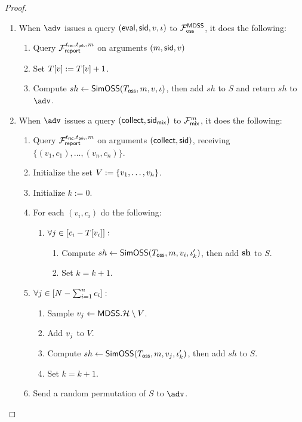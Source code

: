 \begin{proof}
\begin{techbox}
\begin{enumerate}
		\item When $\adv$ issues a query $({\sf eval}, {\sf sid}, v, \iota)$ to $\mathcal{F}_{\sf oss}^{\sf MDSS}$, it does the following:
		\begin{enumerate}
		\item Query $\mathcal{F}_{\sf report}^{t_{\sf rec},t_{\sf priv},m}$ on arguments $(m, {\sf sid}, v)$
		\item Set $T[v] := T[v] + 1$.
		\item Compute $sh \leftarrow {\sf SimOSS}(T_{\sf oss}, m, v, \iota)$, then add $sh$ to $S$ and return $sh$ to $\adv$.
		\end{enumerate}
		\item When $\adv$ issues a query $({\sf collect}, {\sf sid}_{\sf mix})$ to $\mathcal{F}_{\sf mix}^{m}$, it does the following:
		\begin{enumerate}
		\item Query $\mathcal{F}_{\sf report}^{t_{\sf rec},t_{\sf priv},m}$ on arguments $({\sf collect}, {\sf sid})$, receiving $\{(v_1, c_1),\dots,(v_n, c_n)\}$.
		\item Initialize the set $V := \{v_1,\dots,v_{h}\}$.
		\item Initialize $k := 0$.
		\item For each $(v_i, c_i)$ do the following:
		\begin{enumerate}
		\item $\forall j \in [c_i - T[v_i]]:$
		\begin{enumerate}
		\item Compute $sh \leftarrow {\sf SimOSS}(T_{\sf oss}, m, v_i, \iota'_k)$, then add $\mathbf{sh}$ to $S$.
		\item Set $k = k + 1$.
		\end{enumerate}
		\end{enumerate}
		\item $\forall j \in [N - \sum_{i=1}^n c_i]:$
		\begin{enumerate}
		\item Sample $v_j \leftarrow {\sf MDSS}.\mathcal{H} \setminus V$.
		\item Add $v_j$ to $V$.
		\item Compute $sh \leftarrow {\sf SimOSS}(T_{\sf oss}, m, v_j, \iota'_k)$, then add $sh$ to $S$.
		\item Set $k = k + 1$.
		\end{enumerate}
		\item Send a random permutation of $S$ to $\adv$.
		\end{enumerate}
		\end{enumerate}
		\end{techbox}


\end{proof}
